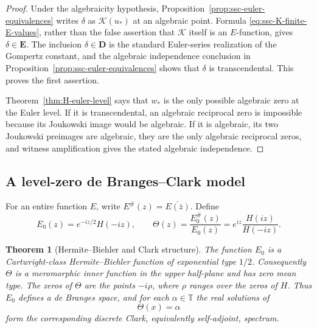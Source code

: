 \documentclass[11pt]{article}
\newtheorem{theorem}{Theorem}[section]
\theoremstyle{definition}
\theoremstyle{remark}
\begin{document}
\begin{proof}
Under the algebraicity hypothesis,
Proposition~\ref{prop:ssc-euler-equivalences} writes \(\delta\) as
\(\mathcal K(u_*)\) at an algebraic point.  Formula
\eqref{eq:ssc-K-finite-E-values}, rather than the false assertion that
\(\mathcal K\) itself is an \(E\)-function, gives
\(\delta\in\mathbf E\).  The inclusion
\(\delta\in\mathbf D\) is the standard Euler-series realization of the
Gompertz constant, and the algebraic independence conclusion in
Proposition~\ref{prop:ssc-euler-equivalences} shows that \(\delta\) is
transcendental.  This proves the first assertion.

Theorem~\ref{thm:H-euler-level} says that \(w_*\) is the only possible
algebraic zero at the Euler level.  If it is transcendental, an algebraic
reciprocal zero is impossible because its Joukowski image would be
algebraic.  If it is algebraic, its two Joukowski preimages are algebraic,
they are the only algebraic reciprocal zeros, and witness amplification
gives the stated algebraic independence.
\end{proof}

\subsection{A level-zero de Branges--Clark model}

For an entire function \(E\), write
\(E^\#(z)=\overline{E(\bar z)}\).  Define
\begin{equation}\label{eq:ssc-E0-Theta}
 E_0(z)=e^{-iz/2}H(-iz),\qquad
 \Theta(z)=\frac{E_0^\#(z)}{E_0(z)}
          =e^{iz}\frac{H(iz)}{H(-iz)}.
\end{equation}

\begin{theorem}[Hermite--Biehler and Clark structure]
\label{thm:ssc-HB-Clark}
The function \(E_0\) is a Cartwright-class Hermite--Biehler function of
exponential type \(1/2\).  Consequently \(\Theta\) is a meromorphic inner
function in the upper half-plane and has zero mean type.  The zeros of
\(\Theta\) are the points \(-i\rho\), where \(\rho\) ranges over the zeros
of \(H\).
Thus \(E_0\) defines a de Branges space, and for each
\(\alpha\in\mathbb T\) the real solutions of
\begin{equation}\label{eq:ssc-Clark-level}
 \Theta(x)=\alpha
\end{equation}
form the corresponding discrete Clark, equivalently self-adjoint, spectrum.
\end{theorem}
\end{document}
